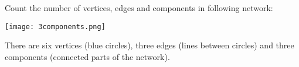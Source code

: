Count the number of vertices, edges and components in following network:
\begin{center}
\texttt{[image: 3components.png]}
\end{center}

\solution
There are six vertices (blue circles), three edges (lines between circles) and three components (connected parts of the network). 


